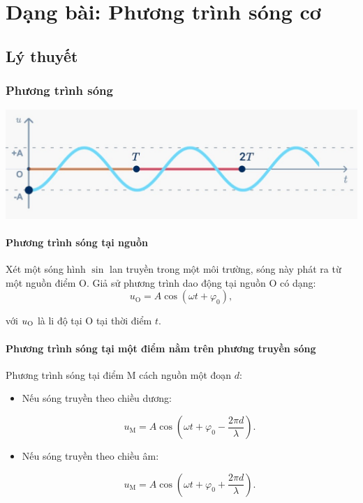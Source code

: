 
\chapter[Dạng bài: Phương trình sóng cơ]{Dạng bài: Phương trình sóng cơ}
\section{Lý thuyết}
\subsection{Phương trình sóng}
\begin{center}
	\includegraphics[scale=0.6]{../figs/VN12-PH-10-A-006-1-V2-1.jpg}
\end{center}
\subsubsection{Phương trình sóng tại nguồn}
Xét một sóng hình $\sin$ lan truyền trong một môi trường, sóng này phát ra từ một nguồn điểm O. Giả sử phương trình dao động tại nguồn O có dạng:
\begin{equation*}
	u_{\text{O}} = A\cos (\omega t + \varphi_0),
\end{equation*}

với $u_\text O$ là li độ tại O tại thời điểm $t$.

\subsubsection{Phương trình sóng tại một điểm nằm trên phương truyền sóng}	
Phương trình sóng tại điểm M cách nguồn một đoạn $d$:
\begin{itemize}
	\item Nếu sóng truyền theo chiều dương:
	
	\begin{equation*}
		u_{\text{M}} = A\cos \left(\omega t + \varphi_0 - \dfrac{2\pi d}{\lambda}\right).
	\end{equation*}
	
	\item Nếu sóng truyền theo chiều âm:
	
	\begin{equation*}
		u_{\text{M}} = A\cos \left(\omega t + \varphi_0 + \dfrac{2\pi d}{\lambda}\right).
	\end{equation*}
	
\end{itemize}

